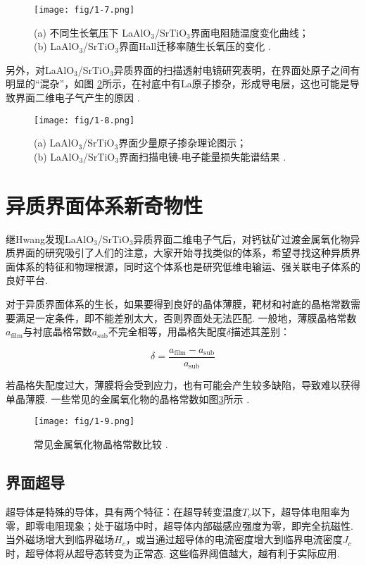 \documentclass[12pt,a4paper,openany,twoside,UTF-8]{book}
\begin{document}
\begin{figure}[htbp]
\centering
\texttt{[image: fig/1-7.png]}
\caption{(a) 不同生长氧压下 LaAlO$_3$/SrTiO$_3$界面电阻随温度变化曲线；\\
(b) LaAlO$_3$/SrTiO$_3$界面Hall迁移率随生长氧压的变化 \cite{ref10}.}
\label{fig:1-7} 
\end{figure}

另外，对LaAlO$_3$/SrTiO$_3$异质界面的扫描透射电镜研究表明，在界面处原子之间有明显的“混杂”，如图 \ref{fig:1-8}所示，在衬底中有La原子掺杂，形成导电层，这也可能是导致界面二维电子气产生的原因 \cite{ref11}.

\begin{figure}[htbp]
\centering
\texttt{[image: fig/1-8.png]}
\caption{(a) LaAlO$_3$/SrTiO$_3$界面少量原子掺杂理论图示；\\ 
(b) LaAlO$_3$/SrTiO$_3$界面扫描电镜-电子能量损失能谱结果 \cite{ref11}.}
\label{fig:1-8} 
\end{figure}

\section{异质界面体系新奇物性}
继Hwang发现LaAlO$_3$/SrTiO$_3$异质界面二维电子气后，对钙钛矿过渡金属氧化物异质界面的研究吸引了人们的注意，大家开始寻找类似的体系，希望寻找这种异质界面体系的特征和物理根源，同时这个体系也是研究低维电输运、强关联电子体系的良好平台.
 
对于异质界面体系的生长，如果要得到良好的晶体薄膜，靶材和衬底的晶格常数需要满足一定条件，即不能差别太大，否则界面处无法匹配. 一般地，薄膜晶格常数$a_{\mathrm{film}}$与衬底晶格常数$a_{\mathrm{sub}}$不完全相等，用晶格失配度$\delta$描述其差别：

\begin{equation}
\delta=\frac{a_{\mathrm{film}}-a_{\mathrm{sub}}}{a_{\mathrm{sub}}}
\label{eq:1-5}
\end{equation}

若晶格失配度过大，薄膜将会受到应力，也有可能会产生较多缺陷，导致难以获得单晶薄膜. 一些常见的金属氧化物的晶格常数如图\ref{fig:1-9}所示 \cite{ref12}.

\begin{figure}[htbp]
\centering
\texttt{[image: fig/1-9.png]}
\caption{常见金属氧化物晶格常数比较 \cite{ref12}.}
\label{fig:1-9} 
\end{figure}

\subsection{界面超导}
超导体是特殊的导体，具有两个特征：在超导转变温度$T_c$以下，超导体电阻率为零，即零电阻现象；处于磁场中时，超导体内部磁感应强度为零，即完全抗磁性. 当外磁场增大到临界磁场$H_c$，或当通过超导体的电流密度增大到临界电流密度$J_c$时，超导体将从超导态转变为正常态. 这些临界阈值越大，越有利于实际应用.
\end{document}
